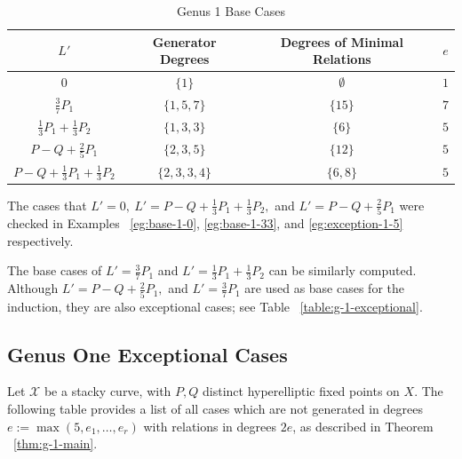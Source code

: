 \documentclass{amsart}
\theoremstyle{plain}
\theoremstyle{definition}
\theoremstyle{remark}
\numberwithin{equation}{section}
\newcommand\ssec{\subsection}
\newcommand\sx{\mathscr X}
\newcommand{\halfcan}{L}
\begin{document}
\begin{table}	
\begin{tabular}
{| c || c | c | c |}	
	\hline
	$\halfcan'$ & Generator Degrees & Degrees of Minimal Relations & $e$ \\
	\hline
	\hline
	$0$ & $\{1\}$ & $\emptyset$ & $1$ \\	\hline

	$\frac{3}{7} P_1$ & $\{1,5,7\}$ & $\{15\}$ & $7$ \\	\hline
	
	$\frac{1}{3} P_1 + \frac{1}{3} P_2$ & $\{1, 3, 3\}$ & $\{6\}$ & $5$ \\	\hline
	
	$P - Q + \frac{2}{5} P_1$ & $\{2, 3, 5\}$ & $\{12\}$ & $5$ \\	\hline
	
	$P - Q + \frac{1}{3} P_1 + \frac{1}{3}P_2$ & $\{2, 3, 3, 4\}$ & $\{6,8\}$ & $5$ \\	\hline
\end{tabular}	

\caption{Genus 1 Base Cases}
\label{table:g-1-base}
\end{table}

The cases that $L' = 0, \: L' = P-Q +\frac{1}{3}P_1 + \frac{1}{3}P_2,$ and $L' = P-Q + \frac{2}{5}P_1$ were checked in Examples ~\ref{eg:base-1-0}, \ref{eg:base-1-33}, and \ref{eg:exception-1-5} respectively.

The base cases of $L' = \frac{3}{7}P_1$ and $L' = \frac{1}{3}P_1 +\frac{1}{3}P_2$ can be similarly computed. Although $L' = P - Q + \frac{2}{5}P_1,$ and $L' = \frac{3}{7}P_1$ are used as base cases for the induction, they are also exceptional cases; see Table ~\ref{table:g-1-exceptional}.

\ssec{Genus One Exceptional Cases}
\label{ssec:g-1-exceptional}
Let $\sx$ be a stacky curve, with $P, Q$ distinct hyperelliptic
fixed points on $X$. The following table provides a list of all
cases which are not generated in degrees $e := \max(5, e_1, \ldots,
e_r)$ with relations in degrees $2e$, as described in Theorem
~\ref{thm:g-1-main}.
\end{document}
